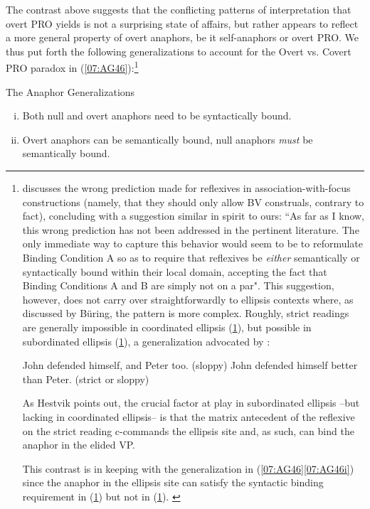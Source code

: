 \documentclass[output=paper,colorlinks,citecolor=brown,draft,draftmode]{langscibook}
\begin{document}
The contrast above suggests that the conflicting patterns of interpretation that overt PRO yields is not a surprising state of affairs, but rather appears to reflect a more general property of overt anaphors, be it self-anaphors or overt PRO. We thus put forth the following generalizations to account for the Overt vs. Covert PRO paradox in (\ref{07:AG46}):\footnote{\citet[141]{buring05} discusses the wrong prediction made for reflexives in association-with-focus constructions (namely, that they should only allow BV construals, contrary to fact), concluding with a suggestion similar in spirit to ours: ``As far as I know, this wrong prediction has not been addressed in the pertinent literature. The only immediate way to capture this behavior would seem to be to reformulate Binding Condition A so as to require that reflexives be \textit{either} semantically or syntactically bound within their local domain, accepting the fact that Binding Conditions A and B are simply not on a par".
This suggestion, however, does not carry over straightforwardly to ellipsis contexts where, as discussed by Büring, the pattern is more complex. Roughly, strict readings are generally impossible in coordinated ellipsis (\ref{07:fn_ex_i}), but possible in subordinated ellipsis (\ref{07:fn_ex_ii}), a generalization advocated by \citet{hestvik92}:
\begin{exe}
\ex \label{07:fn_ex_i} John defended himself, and Peter too.	\hfill	(sloppy)
\ex \label{07:fn_ex_ii} John defended himself better than Peter. \hfill	(strict or sloppy)
\end{exe}
As Hestvik points out, the crucial factor at play in subordinated ellipsis –but lacking in coordinated ellipsis– is that the matrix antecedent of the reflexive on the strict reading c-commands the ellipsis site and, as such, can bind the anaphor in the elided VP.

This contrast is in keeping with the generalization in (\ref{07:AG46}\ref{07:AG46i}) since the anaphor in the ellipsis site can satisfy the syntactic binding requirement in (\ref{07:fn_ex_ii}) but not in (\ref{07:fn_ex_i}).
\label{07:fn11}}

\ea \label{07:AG46}
{The Anaphor Generalizations}
\begin{enumerate}[(i)]
    \item \label{07:AG46i} Both null and overt anaphors need to be syntactically bound.
    \item \label{07:AG46ii} Overt anaphors can be semantically bound, null anaphors \textit{must} be semantically bound.
\end{enumerate}
\z
\end{document}
